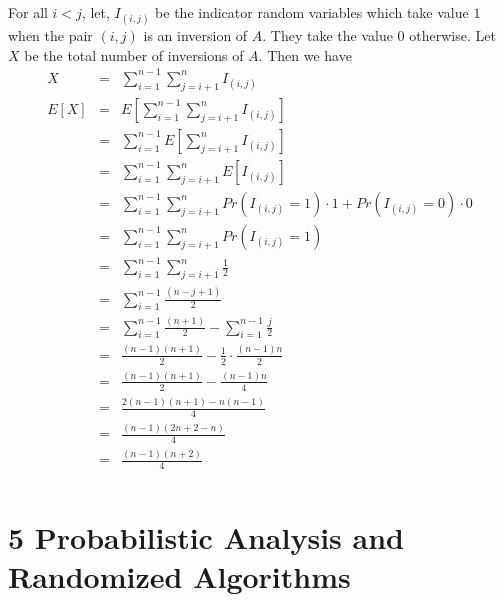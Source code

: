 \documentclass{article}
\begin{document}
\begin{enumerate}
For all $i < j$, let, $I_{(i,j)}$ be the indicator random variables which take value $1$ when the pair $(i,j)$ is an inversion of $A$. They take the value $0$ otherwise. Let $X$ be the total number of inversions of $A$. Then we have 
\begin{eqnarray*}
X &=& \sum_{i=1}^{n-1}\sum_{j= i + 1}^{n} I_{(i,j)}\\
E[X] &=& E\left[\sum_{i=1}^{n-1}\sum_{j= i + 1}^{n} I_{(i,j)}\right]\\
&=& \sum_{i=1}^{n-1}E\left[\sum_{j= i + 1}^{n} I_{(i,j)}\right]\\
&=& \sum_{i=1}^{n-1}\sum_{j= i + 1}^{n} E\left[ I_{(i,j)}\right]\\
&=& \sum_{i=1}^{n-1}\sum_{j= i + 1}^{n} Pr(I_{(i,j)}=1) \cdot 1 + Pr(I_{(i,j)}=0) \cdot 0\\
&=& \sum_{i=1}^{n-1}\sum_{j= i + 1}^{n}Pr(I_{(i,j)}=1)\\
&=& \sum_{i=1}^{n-1}\sum_{j= i + 1}^{n}\frac{1}{2}\\
&=& \sum_{i=1}^{n-1} \frac{(n-j+1)}{2}\\
&=& \sum_{i=1}^{n-1} \frac{(n+1)}{2} - \sum_{i=1}^{n-1} \frac{j}{2}\\
&=& \frac{(n-1)(n+1)}{2} - \frac{1}{2} \cdot \frac{(n-1)n}{2} \\
&=& \frac{(n-1)(n+1)}{2} - \frac{(n-1)n}{4} \\
&=& \frac{2(n-1)(n+1)-n(n-1)}{4}\\
&=& \frac{(n-1)(2n+2-n)}{4}\\
&=& \frac{(n-1)(n+2)}{4}\\
\end{eqnarray*}

\end{enumerate}



\section*{5 Probabilistic Analysis and Randomized Algorithms}
\end{document}
